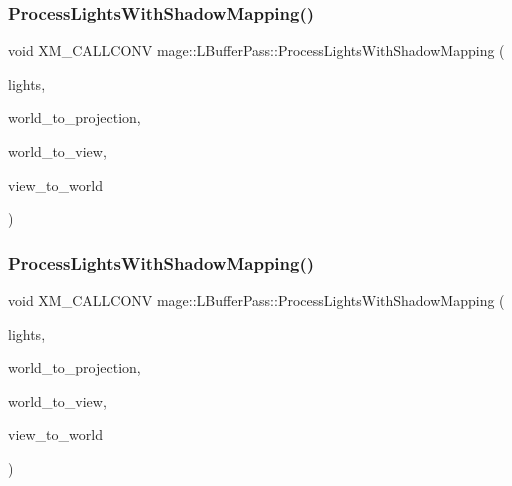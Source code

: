 \subsubsection{\texorpdfstring{Process\+Lights\+With\+Shadow\+Mapping()}{ProcessLightsWithShadowMapping()}\hspace{0.1cm}{\footnotesize\ttfamily [2/3]}}
{\footnotesize\ttfamily void X\+M\+\_\+\+C\+A\+L\+L\+C\+O\+NV mage\+::\+L\+Buffer\+Pass\+::\+Process\+Lights\+With\+Shadow\+Mapping (\begin{DoxyParamCaption}\item[{const vector$<$ const \hyperlink{namespacemage_a1724c6e6b6b5ba535cdd967cbbb4a669}{Omni\+Light\+Node} $\ast$ $>$ \&}]{lights,  }\item[{F\+X\+M\+M\+A\+T\+R\+IX}]{world\+\_\+to\+\_\+projection,  }\item[{C\+X\+M\+M\+A\+T\+R\+IX}]{world\+\_\+to\+\_\+view,  }\item[{C\+X\+M\+M\+A\+T\+R\+IX}]{view\+\_\+to\+\_\+world }\end{DoxyParamCaption})\hspace{0.3cm}{\ttfamily [private]}}

\hypertarget{structmage_1_1_l_buffer_pass_a569c16fc47d2f5d8d47af85cce2822e0}{}\label{structmage_1_1_l_buffer_pass_a569c16fc47d2f5d8d47af85cce2822e0} 
\subsubsection{\texorpdfstring{Process\+Lights\+With\+Shadow\+Mapping()}{ProcessLightsWithShadowMapping()}\hspace{0.1cm}{\footnotesize\ttfamily [3/3]}}
{\footnotesize\ttfamily void X\+M\+\_\+\+C\+A\+L\+L\+C\+O\+NV mage\+::\+L\+Buffer\+Pass\+::\+Process\+Lights\+With\+Shadow\+Mapping (\begin{DoxyParamCaption}\item[{const vector$<$ const \hyperlink{namespacemage_aeed5dee4ff6c591eabb0e9114256df4a}{Spot\+Light\+Node} $\ast$ $>$ \&}]{lights,  }\item[{F\+X\+M\+M\+A\+T\+R\+IX}]{world\+\_\+to\+\_\+projection,  }\item[{C\+X\+M\+M\+A\+T\+R\+IX}]{world\+\_\+to\+\_\+view,  }\item[{C\+X\+M\+M\+A\+T\+R\+IX}]{view\+\_\+to\+\_\+world }\end{DoxyParamCaption})\hspace{0.3cm}{\ttfamily [private]}}

